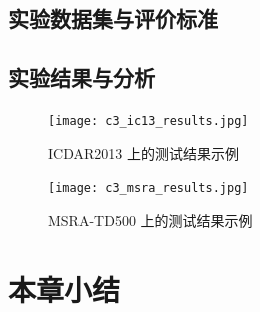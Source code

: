         \subsection{实验数据集与评价标准}

        \subsection{实验结果与分析}

        \begin{figure}[htbp]
        \centering
        \texttt{[image: c3\_ic13\_results.jpg]}
        \label{fig.c3_ic13_results}
        \caption{ICDAR2013 上的测试结果示例}
        \end{figure}

        \begin{figure}[htbp]
        \centering
        \texttt{[image: c3\_msra\_results.jpg]}
        \label{fig.c3_msra_results}
        \caption{MSRA-TD500 上的测试结果示例}
        \end{figure}

    \section{本章小结}


